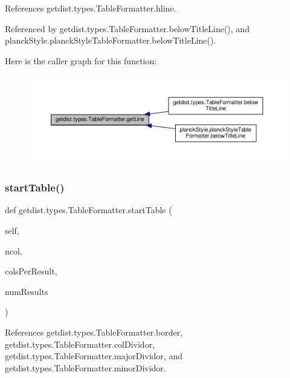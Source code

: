 References getdist.\+types.\+Table\+Formatter.\+hline.



Referenced by getdist.\+types.\+Table\+Formatter.\+below\+Title\+Line(), and planck\+Style.\+planck\+Style\+Table\+Formatter.\+below\+Title\+Line().

Here is the caller graph for this function\+:
\nopagebreak
\begin{figure}[H]
\begin{center}
\leavevmode
\includegraphics[width=350pt]{classgetdist_1_1types_1_1TableFormatter_a04b0d85ebf578c2a6b3da0661fd796c5_icgraph}
\end{center}
\end{figure}
\mbox{\label{classgetdist_1_1types_1_1TableFormatter_a220d0544aff526844f783a67d9dea6cf}} 
\subsubsection{\texorpdfstring{start\+Table()}{startTable()}}
{\footnotesize\ttfamily def getdist.\+types.\+Table\+Formatter.\+start\+Table (\begin{DoxyParamCaption}\item[{}]{self,  }\item[{}]{ncol,  }\item[{}]{cols\+Per\+Result,  }\item[{}]{num\+Results }\end{DoxyParamCaption})}



References getdist.\+types.\+Table\+Formatter.\+border, getdist.\+types.\+Table\+Formatter.\+col\+Dividor, getdist.\+types.\+Table\+Formatter.\+major\+Dividor, and getdist.\+types.\+Table\+Formatter.\+minor\+Dividor.

